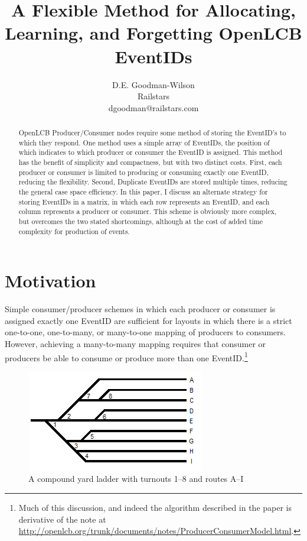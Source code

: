 \documentclass[11pt]{article}
\title{A Flexible Method for Allocating, Learning, and Forgetting OpenLCB EventIDs}
\author{D.E. Goodman-Wilson\\Railstars\\dgoodman@railstars.com}
\begin{document}
\maketitle
\begin{abstract}
OpenLCB Producer/Consumer nodes require some method of storing the EventID's to which they respond. One method uses a simple array of EventIDs, the position of which indicates to which producer or consumer the EventID is assigned. This method has the benefit of simplicity and compactness, but with two distinct costs. First, each producer or consumer is limited to producing or consuming exactly one EventID, reducing the flexibility. Second, Duplicate EventIDs are stored multiple times, reducing the general case space efficiency. In this paper, I discuss an alternate strategy for storing EventIDs in a matrix, in which each row represents an EventID, and each column represents a producer or consumer. This scheme is obviously more complex, but overcomes the two stated shortcomings, although at the cost of added time complexity for production of events.
\end{abstract}

\tableofcontents

\section{Motivation}

Simple consumer/producer schemes in which each producer or consumer is assigned exactly one EventID are sufficient for layouts in which there is a strict one-to-one, one-to-many, or many-to-one mapping of producers to consumers. However, achieving a many-to-many mapping requires that consumer or producers be able to consume or produce more than one EventID.\footnote{Much of this discussion, and indeed the algorithm described in the paper is derivative of the note at \url{http://openlcb.org/trunk/documents/notes/ProducerConsumerModel.html}.}

\begin{figure}[htbp]
\begin{center}
\includegraphics{CompoundLadder.png}
\caption{A compound yard ladder with turnouts 1--8 and routes A--I}
\label{ladder}
\end{center}
\end{figure}
\end{document}
